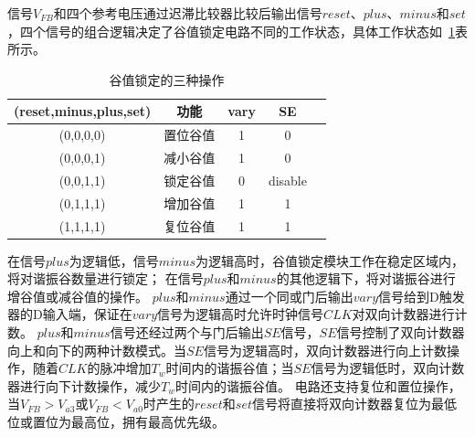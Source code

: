 信号$V_{FB}$和四个参考电压通过迟滞比较器比较后输出信号$reset$、$plus$、$minus$和$set$，四个信号的组合逻辑决定了谷值锁定电路不同的工作状态，具体工作状态如~\ref{tab:谷值锁定电路}表所示。

\begin{table}[htbp]
    \caption{谷值锁定的三种操作}
    \label{tab:谷值锁定电路}
    \centering
        \begin{tabular}{ccccc}
            \toprule
             (reset,minus,plus,set) & 功能 & vary & SE \\
            \midrule
             (0,0,0,0)         & 置位谷值  & 1    &    0       \\  \midrule
             (0,0,0,1)         & 减小谷值  & 1    &    0       \\  \midrule
             (0,0,1,1)         & 锁定谷值  & 0    & disable    \\  \midrule
             (0,1,1,1)         & 增加谷值  & 1    &    1       \\  \midrule
             (1,1,1,1)         & 复位谷值  & 1    &    1       \\
            \bottomrule
        \end{tabular}
\end{table}

在信号$plus$为逻辑低，信号$minus$为逻辑高时，谷值锁定模块工作在稳定区域内，将对谐振谷数量进行锁定；
在信号$plus$和$minus$的其他逻辑下，将对谐振谷进行增谷值或减谷值的操作。
$plus$和$minus$通过一个同或门后输出$vary$信号给到D触发器的D输入端，保证在$vary$信号为逻辑高时允许时钟信号$CLK$对双向计数器进行计数。
$plus$和$minus$信号还经过两个与门后输出$SE$信号，$SE$信号控制了双向计数器向上和向下的两种计数模式。当$SE$信号为逻辑高时，双向计数器进行向上计数操作，随着$CLK$的脉冲增加$T_w$时间内的谐振谷值；当$SE$信号为逻辑低时，双向计数器进行向下计数操作，减少$T_w$时间内的谐振谷值。
电路还支持复位和置位操作，当$V_{FB}>V_{a3}$或$V_{FB}<V_{a0}$时产生的$reset$和$set$信号将直接将双向计数器复位为最低位或置位为最高位，拥有最高优先级。



